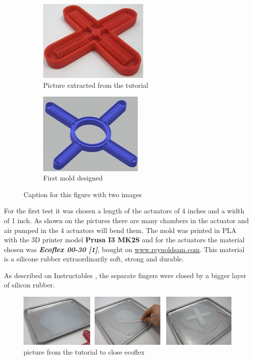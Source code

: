 \documentclass{article}
\begin{document}
\begin{figure}[h]
 
\begin{subfigure}{0.5\textwidth}
\includegraphics[width=0.8\linewidth, height=4cm]{Pictures/moldFromTutorial.jpg} 
\caption{Picture extracted from the tutorial}
\label{fig:moldTut}
\end{subfigure}
\begin{subfigure}{0.5\textwidth}
\includegraphics[width=0.8\linewidth, height=4cm]{Pictures/OurFirstMold.jpg}
\caption{First mold designed}
\label{fig:subim2}
\end{subfigure}
 
\caption{Caption for this figure with two images}
\label{fig:image2}
\end{figure}

For the first test it was chosen a length of the actuators of 4 inches and a width of 1 inch. 
As shown on the pictures there are many chambers in the actuator and air pumped in the 4 actuators will bend them. 
The mold was printed in PLA with the 3D printer model \textbf{Prusa I3 MK2S} and for the actuators the material chosen was \textbf{\textit{Ecoflex 00-30 [1]}}, bought on \underline{www.reynoldsam.com}. This material is a silicone rubber extraordinarily soft, strong and durable.

As described on Instructables \cite{Air-Powered Soft Robot Gripper}, the separate fingers were closed by a bigger layer of silicon rubber.

\begin{figure} [h]
    \centering
    \includegraphics[width=1\textwidth]{Pictures/StepCloseFingers.jpg}
    \caption{picture from the tutorial to close ecoflex}
    \label{fig:tutorialProcess}
\end{figure}
\end{document}
